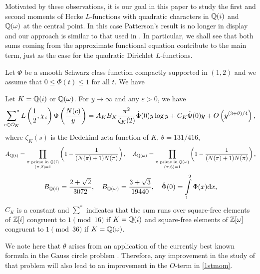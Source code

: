 \documentclass[twoside,leqno,10pt, A4]{amsart}
\begin{document}
   Motivated by these observations, it is our goal in this paper to study the first and second moments of Hecke $L$-functions with quadratic characters in $\mathbb Q(i)$ and $\mathbb Q(\omega)$ at the central point. In this case Patterson's result is no longer in display and our approach is similar to that used in \cite{sound1}. In particular, we shall see that both sums coming from the approximate functional equation contribute to the main term, just as the case for the quadratic Dirichlet $L$-functions. \newline

  Let $\Phi$ be a smooth Schwarz class function compactly supported in $(1, 2)$ and we assume that $0 \leq \Phi(t) \leq 1$ for all $t$. We have
\begin{theorem}
\label{firstmoment}
Let $K = \mathbb{Q}(i)$ or $\mathbb{Q}(\omega)$.  For $y \rightarrow \infty$ and any $\varepsilon > 0$, we have
\begin{align} \label{1stmom}
   \sideset{}{^*}\sum_{c \in \mathcal{O}_K } L\left( \frac{1}{2},
   \chi_c \right)\Phi\left( \frac{N(c)}{y} \right)=A_K B_K \frac{\pi^2}{\zeta_{K}(2)} \hat{\Phi}(0) y\log y +C_K \hat{\Phi}(0)y+O\left( y^{(3+\theta)/4} \right),
\end{align}
   where $\zeta_{K}(s)$ is the Dedekind zeta function of $K$, $\theta=131/416$,
\begin{align} \label{1.4}
   A_{\mathbb{Q}(i)}= \prod_{\substack {\pi \text{ prime in $\mathbb Q(i)$} \\(\pi,2)=1} } \left( 1-\frac {1}{(N(\pi)+1)N(\pi)} \right) , \quad A_{\mathbb{Q}(\omega)}= \prod_{\substack {\pi \text{ prime in $\mathbb Q(\omega)$} \\(\pi,6)=1} } \left( 1-\frac {1}{(N(\pi)+1)N(\pi)} \right),
\end{align}
\[ B_{\mathbb{Q}(i)} = \frac{2+\sqrt{2}}{3072},  \quad B_{\mathbb{Q}(\omega)} = \frac{3+\sqrt{3}}{19440} , \quad \hat{\Phi}(0) = \int\limits_1^2 \Phi(x) \mathrm{d} x , \]
$C_K$ is a constant and $\sum^{*}$ indicates that the sum runs over square-free elements of $\mathbb Z[i]$ congruent to $1 \pmod {16}$ if $K = \mathbb{Q}(i)$ and square-free elements of $\mathbb Z[\omega]$ congruent to $1 \pmod{36}$ if $K = \mathbb{Q}(\omega)$.
\end{theorem}

We note here that $\theta$ arises from an application of the currently best known formula in the Gauss circle problem \cite{Huxley1}.  Therefore, any improvement in the study of that problem will also lead to an improvement in the $O$-term in \eqref{1stmom}. \newline
\end{document}
